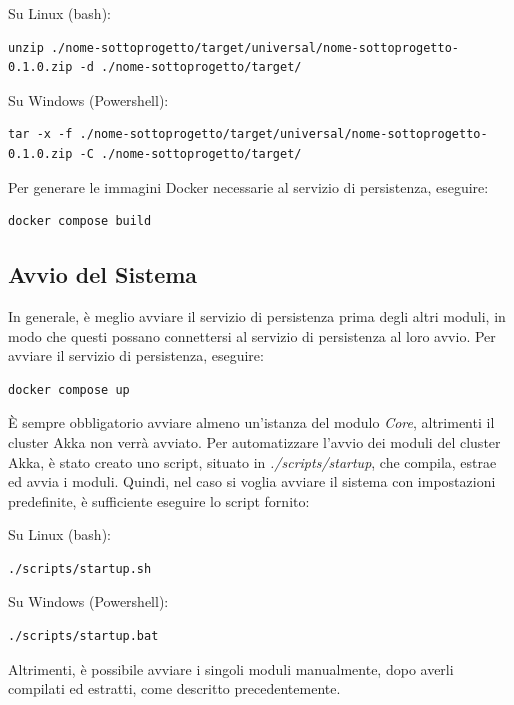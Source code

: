 \documentclass{scrartcl}
\begin{document}
Su Linux (bash):
\begin{lstlisting}
unzip ./nome-sottoprogetto/target/universal/nome-sottoprogetto-0.1.0.zip -d ./nome-sottoprogetto/target/
\end{lstlisting}

Su Windows (Powershell):
\begin{lstlisting}
tar -x -f ./nome-sottoprogetto/target/universal/nome-sottoprogetto-0.1.0.zip -C ./nome-sottoprogetto/target/
\end{lstlisting}

Per generare le immagini Docker necessarie al servizio di persistenza, eseguire:

\begin{lstlisting}[language=bash]
docker compose build
\end{lstlisting}

\subsection{Avvio del Sistema}

In generale, è meglio avviare il servizio di persistenza prima degli altri moduli, in modo che questi possano connettersi al servizio di persistenza al loro avvio. Per avviare il servizio di persistenza, eseguire:

\begin{lstlisting}[language=bash]
docker compose up
\end{lstlisting}

È sempre obbligatorio avviare almeno un'istanza del modulo \textit{Core}, altrimenti il cluster Akka non verrà avviato.
Per automatizzare l'avvio dei moduli del cluster Akka, è stato creato uno script, situato in \textit{./scripts/startup}, che compila, estrae ed avvia i moduli. Quindi, nel caso si voglia avviare il sistema con impostazioni predefinite, è sufficiente eseguire lo script fornito:

Su Linux (bash):

\begin{lstlisting}[language=bash]
./scripts/startup.sh
\end{lstlisting}

Su Windows (Powershell):

\begin{lstlisting}[language=bash]
./scripts/startup.bat
\end{lstlisting}

Altrimenti, è possibile avviare i singoli moduli manualmente, dopo averli compilati ed estratti, come descritto precedentemente.
\end{document}
